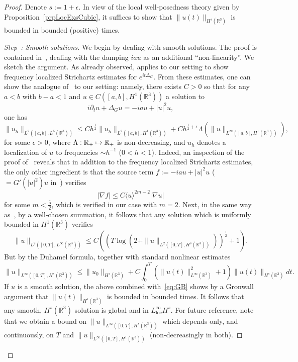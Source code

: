 \documentclass[AHL,Unicode,longabstracts,published]{cedram}
\newcommand*\R{\mathbb{R}}
\DeclareMathOperator{\locc}{loc}
\newcounter{setofstep}
\newcounter{step}[setofstep]
\newenvironment{step}[1][]{\refstepcounter{step}\begin{proof}[{Step~\thestep\if#1\empty\else: #1\fi}]}{\let\qed\relax\end{proof}}
\let\oldmapsto\mapsto
\renewcommand*{\mapsto}{\mathchoice{\longmapsto}{\oldmapsto}{\oldmapsto}{\oldmapsto}}
\begin{document}
\begin{proof}
Denote $s := 1 + \epsilon$. In view of the local well-posedness theory given by Proposition~\ref{prpLocExsCubic}, it suffices to show that $\| u(t) \|_{H^s(\R^3)}$ is bounded in bounded (positive) times.

\begin{step}[{Smooth solutions}]
We begin by dealing with smooth solutions. The proof is contained in~\cite[Section 3.3]{BuGeTz04}, dealing with the damping $iau$ as an additional ``non-linearity''. We sketch the argument. As already observed, \cite{BuGeTz04} applies to our setting to show frequency localized Strichartz estimates for $e^{it\Delta_G}$. From these estimates, one can show the analogue of~\cite[Lemma~3.6]{BuGeTz04} to our setting: namely, there exists $C>0$ so that for any $a<b$ with $b-a < 1$ and $u \in C([a, b], H^1(\R^3))$ a solution to
\[
i \partial_t u + \Delta_G u = - i au + |u|^2 u,
\]
one has
\begin{equation}\label{eq:3.11}
\| u_h \|_{L^2\left([a,b], L^6(\R^3)\right)} \leq C h^{\frac 12}
\| u_h\|_{L^2\left([a,b],H^1(\R^3)\right)} + Ch^{\frac 12 + \epsilon} \Lambda\left(\| u \|_{L^\infty\left([a,b], H^1(\R^3)\right)}\right),
\end{equation}
for some $\epsilon > 0$, where $\Lambda : \R_+ \mapsto \R_+$ is non-decreasing, and $u_h$ denotes a localization of $u$ to frequencies $\sim h^{-1}$ ($0<h<1$). Indeed, an inspection of the proof of~\cite[Lemma~3.6]{BuGeTz04} reveals that in addition to the frequency localized Strichartz estimates, the only other ingredient is that the source term $f:= - i au + |u|^2 u$ ($= G'(|u|^2)u$ in~\cite{BuGeTz04}) verifies
\[
|\nabla f| \leq C \langle u \rangle^{2m - 2} |\nabla u|
\]
for some $m< \frac 5 2$, which is verified in our case with $m = 2$. Next, in the same way as~\cite[p.~589-590]{BuGeTz04}, by a well-chosen summation, it follows that any solution which is uniformly bounded in $H^1(\R^3)$ verifies
\begin{equation}\label{eq:GB}
\| u \|_{L^2([0,T], L^\infty(\R^3))} \leq C \left(\left(T \log\left(2 + \| u \|_{L^2\left([0,T], H^s(\R^3)\right)}\right)\right)^{\frac 12} + 1\right).
\end{equation}
But by the Duhamel formula, together with standard nonlinear estimates
\[
\| u \|_{L^\infty\left([0, T], H^s(\R^3)\right)} \leq \| u_0 \|_{H^s(\R^3)} + C \int_0^T \left(\| u(t) \|_{L^\infty(\R^3)}^2 + 1\right)\| u(t) \|_{H^s(\R^3)} dt.
\]
If $u$ is a smooth solution, the above combined with~\eqref{eq:GB} shows by a Gronwall argument that $\| u(t) \|_{H^s(\R^3)}$ is bounded in bounded times. It follows that any smooth, $H^s(\R^3)$ solution is global and in $L^\infty_{\locc}H^s$. For future reference, note that we obtain a bound on $\| u \|_{L^\infty([0, T], H^s(\R^3))}$ which depends only, and continuously, on $T$ and $\| u \|_{L^\infty([0, T], H^1(\R^3))}$ (non-decreasingly in both).
\end{step}


\end{proof}
\end{document}
